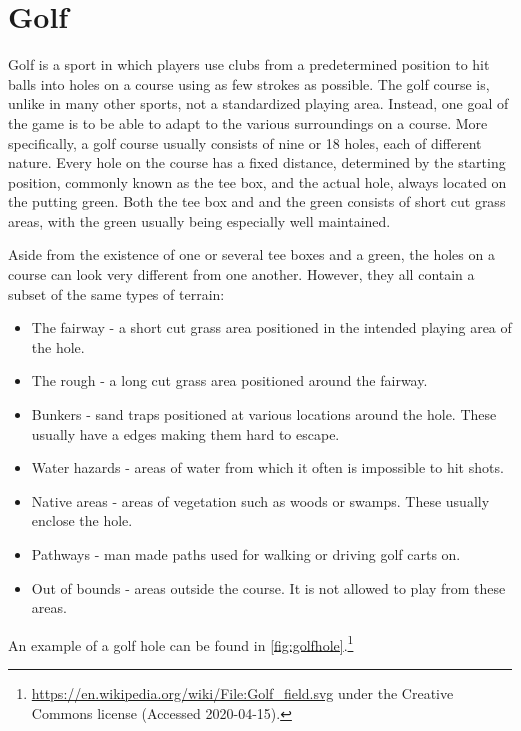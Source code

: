 \documentclass{kththesis}
\begin{document}
\section{Golf}
\label{sec:golf}
Golf is a sport in which players use clubs from a predetermined position to hit balls into holes on a course using as few strokes as possible. The golf course is, unlike in many other sports, not a standardized playing area. Instead, one goal of the game is to be able to adapt to the various surroundings on a course. More specifically, a golf course usually consists of nine or 18 holes, each of different nature. Every hole on the course has a fixed distance, determined by the starting position, commonly known as the tee box, and the actual hole, always located on the putting green. Both the tee box and and the green consists of short cut grass areas, with the green usually being especially well maintained.

Aside from the existence of one or several tee boxes and a green, the holes on a course can look very different from one another. However, they all contain a subset of the same types of terrain:
\begin{itemize}
    \item The fairway - a short cut grass area positioned in the intended playing area of the hole. 
    \item The rough - a long cut grass area positioned around the fairway.
    \item Bunkers - sand traps positioned at various locations around the hole. These usually have a edges making them hard to escape.
    \item Water hazards - areas of water from which it often is impossible to hit shots.
    \item Native areas - areas of vegetation such as woods or swamps. These usually enclose the hole.
    \item Pathways - man made paths used for walking or driving golf carts on.
    \item Out of bounds - areas outside the course. It is not allowed to play from these areas.
\end{itemize}
An example of a golf hole can be found in \autoref{fig:golfhole}.\footnote{\url{https://en.wikipedia.org/wiki/File:Golf_field.svg} under the Creative Commons license (Accessed 2020-04-15).}
\end{document}
